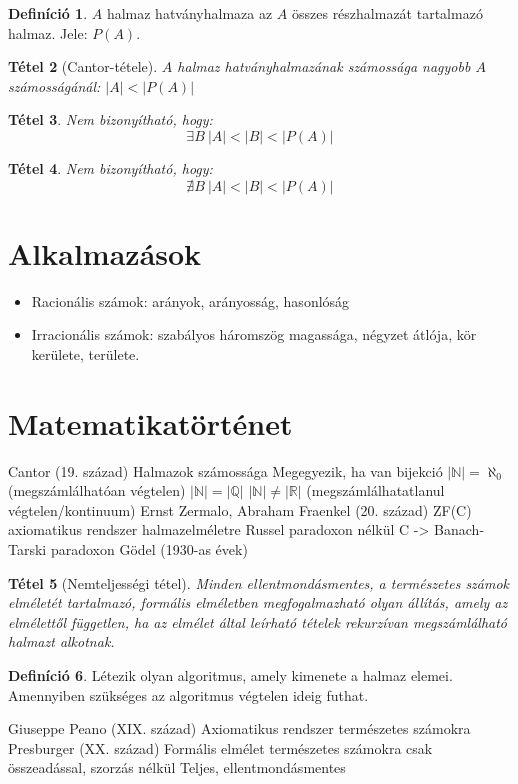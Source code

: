 \documentclass[twoside,12pt]{report}
\newtheorem{theorem}{Tétel}[section]
\theoremstyle{definition}
\newtheorem{definition}[theorem]{Definíció}
\begin{document}
	\begin{definition}
		$A$ halmaz hatványhalmaza az $A$ összes részhalmazát tartalmazó halmaz. Jele: $P(A)$.
	\end{definition}
	\begin{theorem}[Cantor-tétele]
		$A$ halmaz hatványhalmazának számossága nagyobb $A$ számosságánál: $|A|<|P(A)|$
	\end{theorem}
	\begin{theorem}
		Nem bizonyítható, hogy:
		\begin{equation*}
			\exists B\ |A|<|B|<|P(A)|
		\end{equation*}
	\end{theorem}
	\begin{theorem}
		Nem bizonyítható, hogy:
		\begin{equation*}
			\nexists B\ |A|<|B|<|P(A)|
		\end{equation*}
	\end{theorem}
\section{Alkalmazások}
	\begin{itemize}
		\item Racionális számok: arányok, arányosság, hasonlóság
		\item Irracionális számok: szabályos háromszög magassága, négyzet átlója, kör kerülete, területe.
	\end{itemize}
\section{Matematikatörténet}
\begin{outline}
	\1 Cantor (19. század)
		\2 Halmazok számossága
			\3 Megegyezik, ha van bijekció
		\2 $|\mathbb{N}|=\aleph_0$ (megszámlálhatóan végtelen)
		\2 $|\mathbb{N}|=|\mathbb{Q}|$
		\2 $|\mathbb{N}|\ne|\mathbb{R}|$ (megszámlálhatatlanul végtelen/kontinuum)
	\1 Ernst Zermalo, Abraham Fraenkel (20. század)
		\2 ZF(C) axiomatikus rendszer halmazelméletre Russel paradoxon nélkül
		\2 C -> Banach-Tarski paradoxon
	\1 Gödel (1930-as évek)
		\2[]
		\begin{theorem}[Nemteljességi tétel]
			Minden ellentmondásmentes, a természetes számok elméletét tartalmazó, formális elméletben megfogalmazható olyan állítás, amely az elmélettől független, ha az elmélet által leírható tételek rekurzívan megszámlálható halmazt alkotnak.
		\end{theorem}
		\2[] 
		\begin{definition}
			Létezik olyan algoritmus, amely kimenete a halmaz elemei. Amennyiben szükséges az algoritmus végtelen ideig futhat.
		\end{definition}
	\1 Giuseppe Peano (XIX. század)
		\2 Axiomatikus rendszer természetes számokra
	\1 Presburger (XX. század)
		\2 Formális elmélet természetes számokra csak összeadással, szorzás nélkül
		\2 Teljes, ellentmondásmentes
\end{outline}
\end{document}
